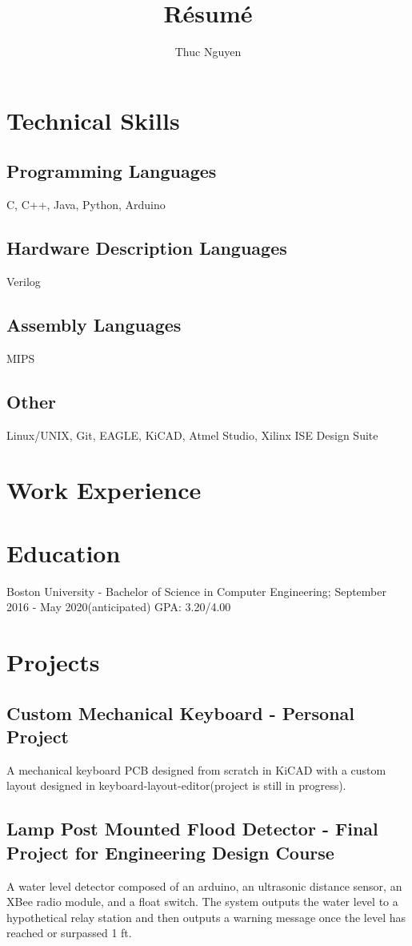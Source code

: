 \documentclass{article}
\begin{document}
\title{R\'esum\'e}
\author{Thuc Nguyen}
\maketitle

\section{Technical Skills}
\subsection{Programming Languages}
C, C++, Java, Python, Arduino
\subsection{Hardware Description Languages}
Verilog
\subsection{Assembly Languages}
MIPS
\subsection{Other}
Linux/UNIX, Git, EAGLE, KiCAD, Atmel Studio, Xilinx ISE Design Suite

\section{Work Experience}

\section{Education}
Boston University - Bachelor of Science in Computer Engineering; September 2016 - May 2020(anticipated)
GPA: 3.20/4.00

\section{Projects}
\subsection{Custom Mechanical Keyboard - Personal Project}
A mechanical keyboard PCB designed from scratch in KiCAD with a custom layout designed in keyboard-layout-editor(project is still in progress).
\subsection{Lamp Post Mounted Flood Detector - Final Project for Engineering Design Course}
A water level detector composed of an arduino, an ultrasonic distance sensor, an XBee radio module, and a float switch. The system outputs the water level to a hypothetical relay station and then outputs a warning message once the level has reached or surpassed 1 ft.
\end{document}
